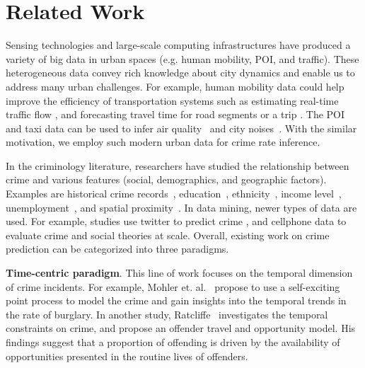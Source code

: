 
\section{Related Work}
\label{sec:related-work}


Sensing technologies and large-scale computing infrastructures have produced a variety of big data in urban spaces (e.g. human mobility, POI, and traffic). These heterogeneous data convey rich knowledge about city dynamics and enable us to  address many urban challenges. For example, human mobility data could help improve the efficiency of transportation systems such as estimating real-time traffic flow \cite{HHAB10,CCLP+11}, and forecasting travel time for road segments \cite{CJJH09,FLL11,SiZa11} or a trip \cite{TRLM+09,WKKL16}. The POI and taxi data can be used to infer air quality~\cite{ZLH13} and city noises~\cite{ZLWZ+14}. With the similar motivation, we employ such modern urban data for crime rate inference. 


\medskip

In the criminology literature, researchers have studied the relationship between crime and various features (social, demographics, and geographic factors). Examples are historical crime records~\cite{MSBS+12,WRWS13}, education~\cite{Ehrl75}, ethnicity~\cite{Brai89}, income level~\cite{Patt91}, unemployment~\cite{Free99}, and spatial proximity~\cite{Ans02}. 
In data mining, newer types of data are used. For example, studies use twitter to predict crime \cite{WGB12,Gerb14}, and cellphone data \cite{TQC14,Bogo14} to evaluate crime and social theories at scale. Overall, existing work on crime prediction can be categorized into three paradigms.


\smallskip
\textbf{Time-centric paradigm}. This line of work focuses on the temporal dimension of crime incidents. For example, Mohler et. al.~\cite{MSBS+12} propose to use a self-exciting point process to model the crime and gain insights into the temporal trends in the rate of burglary. In another study, Ratcliffe~\cite{Ratc06} investigates the temporal constraints on crime, and propose an offender travel and opportunity model. His findings suggest that a proportion of offending is driven by the availability of opportunities presented in the  routine lives of offenders. 

